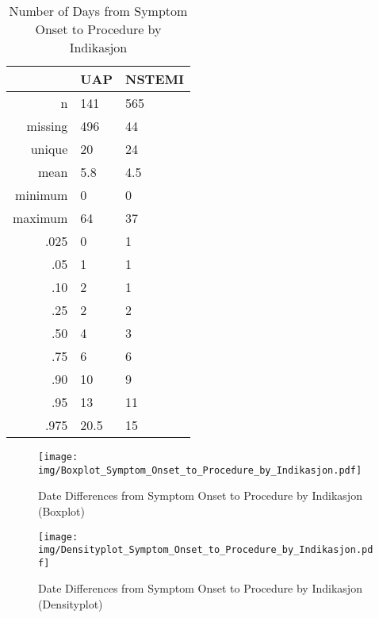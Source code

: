 \documentclass[a4paper]{report}
\begin{document}
\begin{itemize}
{%
\begin{table}[ht]
\centering
\begin{tabular}{rll}
  \toprule
 & UAP & NSTEMI \\ 
  \midrule
n & 141 & 565 \\ 
  missing & 496 & 44 \\ 
  unique & 20 & 24 \\ 
  mean & 5.8 & 4.5 \\ 
  minimum & 0 & 0 \\ 
  maximum & 64 & 37 \\ 
  .025 & 0 & 1 \\ 
  .05 & 1 & 1 \\ 
  .10 & 2 & 1 \\ 
  .25 & 2 & 2 \\ 
  .50 & 4 & 3 \\ 
  .75 & 6 & 6 \\ 
  .90 & 10 & 9 \\ 
  .95 & 13 & 11 \\ 
  .975 & 20.5 & 15 \\ 
   \bottomrule
\end{tabular}
\caption{Number of Days from Symptom Onset to Procedure by Indikasjon} 
\end{table}
\begin{figure}
  \centering
  \caption{Date Differences from Symptom Onset to Procedure by Indikasjon (Boxplot)}
  \label{Boxplot: Date Differences from Symptom Onset to Procedure by Indikasjon}
\texttt{[image: img/Boxplot\_Symptom\_Onset\_to\_Procedure\_by\_Indikasjon.pdf]}\end{figure}


\begin{figure}
  \centering
  \caption{Date Differences from Symptom Onset to Procedure by Indikasjon (Densityplot)}
  \label{Density: Date Differences from Symptom Onset to Procedure by Indikasjon}
\texttt{[image: img/Densityplot\_Symptom\_Onset\_to\_Procedure\_by\_Indikasjon.pdf]}\end{figure}



\clearpage

}
\end{itemize}
\end{document}
